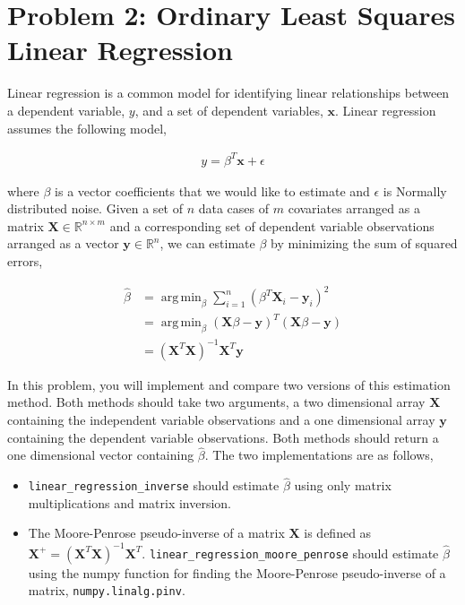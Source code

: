 \documentclass[11pt]{article} %
\DeclareMathOperator*{\argmin}{arg\,min}
\begin{document}
\section{Problem 2: Ordinary Least Squares Linear Regression}
Linear regression is a common model for identifying linear relationships between a dependent variable, $y$, and a set of dependent variables, $\mathbf{x}$. Linear regression assumes the following model,

\begin{align*}
	y = \beta^T \mathbf{x} + \epsilon
\end{align*}

where $\beta$ is a vector coefficients that we would like to estimate and $\epsilon$ is Normally distributed noise. Given a set of $n$ data cases of $m$ covariates arranged as a matrix $\mathbf{X} \in \mathbb{R}^{n\times m}$ and a corresponding set of dependent variable observations arranged as a vector $\mathbf{y} \in \mathbb{R}^n$, we can estimate $\beta$ by minimizing the sum of squared errors,

\begin{align*}
	\hat{\beta} &= \argmin_\beta \sum_{i=1}^n (\beta^T \mathbf{X}_i - \mathbf{y}_i)^2\\
	&= \argmin_\beta (\mathbf{X}\beta - \mathbf{y})^T(\mathbf{X}\beta - \mathbf{y})\\
	&= (\mathbf{X}^T\mathbf{X})^{-1}\mathbf{X}^T\mathbf{y}
\end{align*}

In this problem, you will implement and compare two versions of this estimation method. Both methods should take two arguments, a two dimensional array $\mathbf{X}$ containing the independent variable observations and a one dimensional array $\mathbf{y}$ containing the dependent variable observations. Both methods should return a one dimensional vector containing $\hat{\beta}$. The two implementations are as follows,

\begin{itemize}
	\item \verb|linear_regression_inverse| should estimate $\hat{\beta}$ using only matrix multiplications and matrix inversion.
	\item The Moore-Penrose pseudo-inverse of a matrix $\mathbf{X}$ is defined as $\mathbf{X}^+ = (\mathbf{X}^T \mathbf{X})^{-1} \mathbf{X}^T$. \verb|linear_regression_moore_penrose| should estimate $\hat{\beta}$ using the numpy function for finding the Moore-Penrose pseudo-inverse of a matrix, \verb|numpy.linalg.pinv|. 
\end{itemize}
\end{document}
